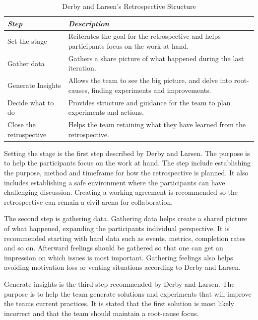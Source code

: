 \begin{table}[h]
	\begin{center}
		\caption{Derby and Larsen's Retrospective Structure}
		\label{table:retrospective-structure}
		\begin{tabular}{p{} p{}}
			\hline
			\textit{Step} & \textit{Description} \\
			\hline
			Set the stage & Reiterates the goal for the retrospective and helps participants focus on the work at hand. \\
			Gather data & Gathers a share picture of what happened during the last iteration. \\
			Generate Insights & Allows the team to see the big picture, and delve into root-causes, finding experiments and improvements. \\
			Decide what to do &  Provides structure and guidance for the team to plan experiments and actions. \\
			Close the retrospective & Helps the team retaining what they have learned from the retrospective. \\
			\hline
		\end{tabular}
	\end{center}
\end{table}

Setting the stage is the first step described by Derby and Larsen. The purpose is to help the participants focus on the work at hand. The step include establishing the purpose, method and timeframe for how the retrospective is planned. It also includes establishing a safe environment where the participants can have challenging discussion. Creating a working agreement is recommended so the retrospective can remain a civil arena for collaboration. 

The second step is gathering data. Gathering data helps create a shared picture of what happened, expanding the participants individual perspective. It is recommended starting with hard data such as events, metrics, completion rates and so on. Afterward feelings should be gathered so that one can get an impression on which issues is most important. Gathering feelings also helps avoiding motivation loss or venting situations according to Derby and Larsen.

Generate insights is the third step recommended by Derby and Larsen. The purpose is to help the team generate solutions and experiments that will improve the teams current practices. It is stated that the first solution is most likely incorrect and that the team should maintain a root-cause focus. 

